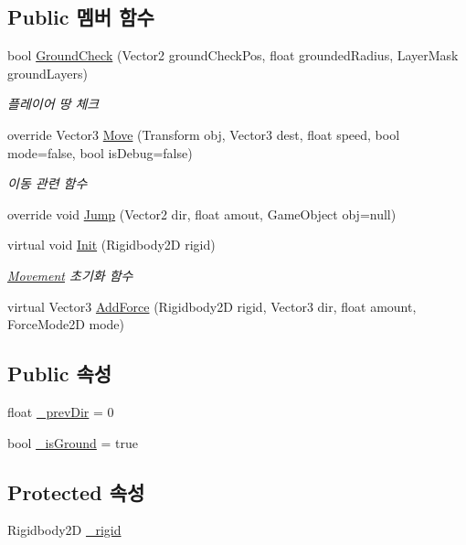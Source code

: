 \subsection*{Public 멤버 함수}
\begin{DoxyCompactItemize}
\item 
bool \mbox{\hyperlink{class_player_movement_a957f2e09268831052dbd00a9e8e4fa70}{Ground\+Check}} (Vector2 ground\+Check\+Pos, float grounded\+Radius, Layer\+Mask ground\+Layers)
\begin{DoxyCompactList}\small\item\em 플레이어 땅 체크 \end{DoxyCompactList}\item 
override Vector3 \mbox{\hyperlink{class_player_movement_a339fca7a54775c8016fb137e3f1b1df7}{Move}} (Transform obj, Vector3 dest, float speed, bool mode=false, bool is\+Debug=false)
\begin{DoxyCompactList}\small\item\em 이동 관련 함수 \end{DoxyCompactList}\item 
override void \mbox{\hyperlink{class_player_movement_a64ce92029a6d91f12d23332bdd44a6ab}{Jump}} (Vector2 dir, float amout, Game\+Object obj=null)
\item 
virtual void \mbox{\hyperlink{class_movement_a1c50c07edbe274e1cf55253e87506684}{Init}} (Rigidbody2D rigid)
\begin{DoxyCompactList}\small\item\em \mbox{\hyperlink{class_movement}{Movement}} 초기화 함수 \end{DoxyCompactList}\item 
virtual Vector3 \mbox{\hyperlink{class_movement_ab0b20a2f058e2eed15f4bdf0503a2566}{Add\+Force}} (Rigidbody2D rigid, Vector3 dir, float amount, Force\+Mode2D mode)
\end{DoxyCompactItemize}
\subsection*{Public 속성}
\begin{DoxyCompactItemize}
\item 
float \mbox{\hyperlink{class_player_movement_a802b794d028125d4e547a9caeb90d3d4}{\+\_\+prev\+Dir}} = 0
\item 
bool \mbox{\hyperlink{class_player_movement_a3096725f76488ebfdc761c53e9fac852}{\+\_\+is\+Ground}} = true
\end{DoxyCompactItemize}
\subsection*{Protected 속성}
\begin{DoxyCompactItemize}
\item 
Rigidbody2D \mbox{\hyperlink{class_movement_a8b24a93b5f529e53c668ff81bde13c0d}{\+\_\+rigid}}
\end{DoxyCompactItemize}


